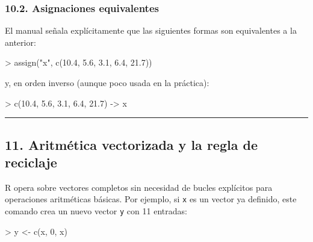 \documentclass[
  jou,
  floatsintext,
  longtable,
  a4paper,
  nolmodern,
  notxfonts,
  notimes,
  12pt,
  colorlinks=true,linkcolor=blue,citecolor=blue,urlcolor=blue]{apa7}
\newenvironment{Shaded}{\begin{snugshade}}{\end{snugshade}}
\newcommand{\DecValTok}[1]{\textcolor[rgb]{0.68,0.00,0.00}{#1}}
\newcommand{\FloatTok}[1]{\textcolor[rgb]{0.68,0.00,0.00}{#1}}
\newcommand{\FunctionTok}[1]{\textcolor[rgb]{0.28,0.35,0.67}{#1}}
\newcommand{\NormalTok}[1]{\textcolor[rgb]{0.00,0.23,0.31}{#1}}
\newcommand{\OtherTok}[1]{\textcolor[rgb]{0.00,0.23,0.31}{#1}}
\newcommand{\SpecialCharTok}[1]{\textcolor[rgb]{0.37,0.37,0.37}{#1}}
\newcommand{\StringTok}[1]{\textcolor[rgb]{0.13,0.47,0.30}{#1}}
\begin{document}
\subsubsection{10.2. Asignaciones
equivalentes}\label{asignaciones-equivalentes}

El manual señala explícitamente que las siguientes formas son
equivalentes a la anterior:

\begin{Shaded}
\begin{Highlighting}[]
\SpecialCharTok{\textgreater{}} \FunctionTok{assign}\NormalTok{(}\StringTok{"x"}\NormalTok{, }\FunctionTok{c}\NormalTok{(}\FloatTok{10.4}\NormalTok{, }\FloatTok{5.6}\NormalTok{, }\FloatTok{3.1}\NormalTok{, }\FloatTok{6.4}\NormalTok{, }\FloatTok{21.7}\NormalTok{))}
\end{Highlighting}
\end{Shaded}

y, en orden inverso (aunque poco usada en la práctica):

\begin{Shaded}
\begin{Highlighting}[]
\SpecialCharTok{\textgreater{}} \FunctionTok{c}\NormalTok{(}\FloatTok{10.4}\NormalTok{, }\FloatTok{5.6}\NormalTok{, }\FloatTok{3.1}\NormalTok{, }\FloatTok{6.4}\NormalTok{, }\FloatTok{21.7}\NormalTok{) }\OtherTok{{-}\textgreater{}}\NormalTok{ x}
\end{Highlighting}
\end{Shaded}

\begin{center}\rule{0.5\linewidth}{0.5pt}\end{center}

\subsection{11. Aritmética vectorizada y la regla de
reciclaje}\label{aritmuxe9tica-vectorizada-y-la-regla-de-reciclaje}

R opera sobre vectores completos sin necesidad de bucles explícitos para
operaciones aritméticas básicas. Por ejemplo, si \texttt{x} es un vector
ya definido, este comando crea un nuevo vector \texttt{y} con 11
entradas:

\begin{Shaded}
\begin{Highlighting}[]
\SpecialCharTok{\textgreater{}}\NormalTok{ y }\OtherTok{\textless{}{-}} \FunctionTok{c}\NormalTok{(x, }\DecValTok{0}\NormalTok{, x)}
\end{Highlighting}
\end{Shaded}
\end{document}
